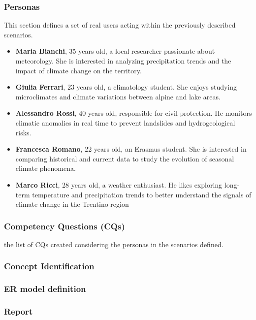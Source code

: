 \subsubsection{Personas}
This section defines a set of real users acting within the previously described scenarios.
\begin{itemize}
    \item \textbf{Maria Bianchi}, 35 years old, a local researcher passionate about meteorology. She is interested in analyzing precipitation trends and the impact of climate change on the territory.
    \item \textbf{Giulia Ferrari}, 23 years old, a climatology student. She enjoys studying microclimates and climate variations between alpine and lake areas.
    \item \textbf{Alessandro Rossi}, 40 years old, responsible for civil protection. He monitors climatic anomalies in real time to prevent landslides and hydrogeological risks.
    \item \textbf{Francesca Romano}, 22 years old, an Erasmus student. She is interested in comparing historical and current data to study the evolution of seasonal climate phenomena.
    \item \textbf{Marco Ricci}, 28 years old, a weather enthusiast. He likes exploring long-term temperature and precipitation trends to better understand the signals of climate change in the Trentino region
\end{itemize}



\subsubsection{Competency Questions (CQs)}
the list of CQs created considering the personas in the scenarios defined.
\subsubsection{Concept Identification}
\subsubsection{ER model definition}
\subsubsection{Report}






